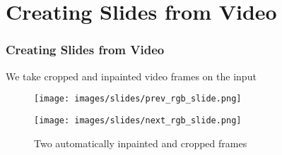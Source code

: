 \section{Creating Slides from Video}
\begin{frame}
  \frametitle{Creating Slides from Video}

  We take cropped and inpainted video frames on the input

  \begin{figure}[ht]
    \begin{minipage}[a]{0.7\linewidth}
        \centering
        \texttt{[image: images/slides/prev\_rgb\_slide.png]}
    \end{minipage}
    \hspace{0.5cm}
    \begin{minipage}[b]{0.7\linewidth}
        \centering
        \texttt{[image: images/slides/next\_rgb\_slide.png]}
    \end{minipage}
    \caption{Two automatically inpainted and cropped frames}
\end{figure}

\end{frame}
